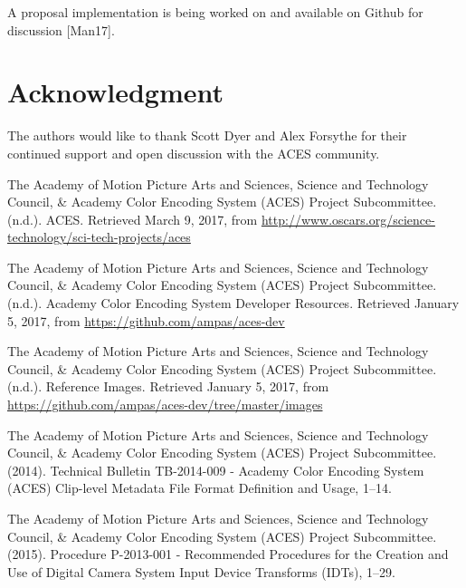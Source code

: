 \documentclass[conference]{IEEEtran}
\begin{document}
A proposal implementation is being worked on and available on Github for discussion [Man17].

\section*{Acknowledgment}
The authors would like to thank Scott Dyer and Alex Forsythe for their continued support and open discussion with the ACES community.

\begin{thebibliography}{1}
    \makeatletter
    \renewcommand\
    \makeatother

\renewcommand\@biblabel[1]{[AmA17]}
\bibitem{}
The Academy of Motion Picture Arts and Sciences, Science and Technology Council, \& Academy Color Encoding System (ACES) Project Subcommittee. (n.d.). ACES. Retrieved March 9, 2017, from \url{http://www.oscars.org/science-technology/sci-tech-projects/aces} \vspace{2mm}

\renewcommand\@biblabel[1]{[AmB17]}
\bibitem{}
The Academy of Motion Picture Arts and Sciences, Science and Technology Council, \& Academy Color Encoding System (ACES) Project Subcommittee. (n.d.). Academy Color Encoding System Developer Resources. Retrieved January 5, 2017, from \url{https://github.com/ampas/aces-dev} \vspace{2mm}

\renewcommand\@biblabel[1]{[AmC17]}
\bibitem{}
The Academy of Motion Picture Arts and Sciences, Science and Technology Council, \& Academy Color Encoding System (ACES) Project Subcommittee. (n.d.). Reference Images. Retrieved January 5, 2017, from \url{https://github.com/ampas/aces-dev/tree/master/images} \vspace{2mm}

\renewcommand\@biblabel[1]{[Amp14]}
\bibitem{}
The Academy of Motion Picture Arts and Sciences, Science and Technology Council, \& Academy Color Encoding System (ACES) Project Subcommittee. (2014). Technical Bulletin TB-2014-009 - Academy Color Encoding System (ACES) Clip-level Metadata File Format Definition and Usage, 1–14. \vspace{2mm}

\renewcommand\@biblabel[1]{[Amp15]}
\bibitem{}
The Academy of Motion Picture Arts and Sciences, Science and Technology Council, \& Academy Color Encoding System (ACES) Project Subcommittee. (2015). Procedure P-2013-001 - Recommended Procedures for the Creation and Use of Digital Camera System Input Device Transforms (IDTs), 1–29. \vspace{2mm}


\end{thebibliography}
\end{document}
